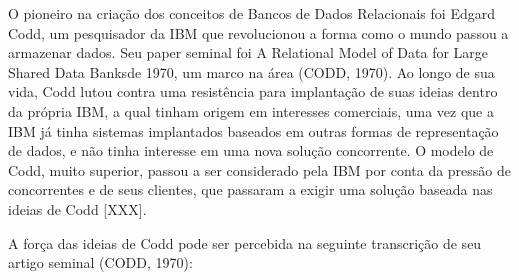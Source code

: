 \documentclass[
12pt,		%
openright,	%
twoside,  %
a4paper,			%
chapter=TITLE,		%
english,			%
french,				%
spanish,			%
brazil				%
]{USPSC-classe/USPSC}
\begin{document}
O pioneiro na cria\c{c}\~ao dos conceitos de Bancos de Dados Relacionais foi Edgard Codd, um pesquisador da IBM que revolucionou a forma como o mundo passou a armazenar dados. Seu paper seminal foi  \textquotedbl A Relational Model of Data for Large Shared Data Banks\textquotedbl  de 1970, um marco na \'area (CODD, 1970). Ao longo de sua vida, Codd lutou contra uma resist\^encia para implanta\c{c}\~ao de suas ideias dentro da pr\'opria IBM, a qual tinham origem em interesses comerciais, uma vez que a IBM j\'a tinha sistemas implantados baseados em outras formas de representa\c{c}\~ao de dados, e n\~ao tinha interesse em uma nova solu\c{c}\~ao concorrente. O modelo de Codd, muito superior, passou a ser considerado pela IBM por conta da press\~ao de concorrentes e de seus clientes, que passaram a exigir uma solu\c{c}\~ao baseada nas ideias de Codd [XXX].














A for\c{c}a das ideias de Codd pode ser percebida na seguinte transcri\c{c}\~ao de seu artigo seminal (CODD, 1970):















\noindent\begin{center}\mbox{\centering{}}\end{center}
\end{document}

